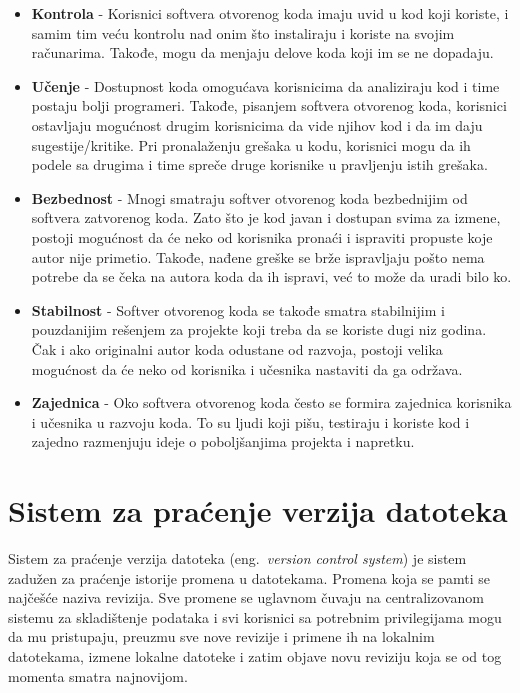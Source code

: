 \documentclass[12pt]{report}
\begin{document}
\begin{itemize}
    \item \textbf{Kontrola} - Korisnici softvera otvorenog koda imaju uvid u kod koji koriste, i samim tim veću kontrolu nad onim što instaliraju i koriste na svojim računarima. Takođe, mogu da menjaju delove koda koji im se ne dopadaju.
    \item \textbf{Učenje} - Dostupnost koda omogućava korisnicima da analiziraju kod i time postaju bolji programeri. Takođe, pisanjem softvera otvorenog koda, korisnici ostavljaju mogućnost drugim korisnicima da vide njihov kod i da im daju sugestije/kritike. Pri pronalaženju grešaka u kodu, korisnici mogu da ih podele sa drugima i time spreče druge korisnike u pravljenju istih grešaka.
    \item \textbf{Bezbednost} - Mnogi smatraju softver otvorenog koda bezbednijim od softvera zatvorenog koda. Zato što je kod javan i dostupan svima za izmene, postoji mogućnost da će neko od korisnika pronaći i ispraviti propuste koje autor nije primetio. Takođe, nađene greške se brže ispravljaju pošto nema potrebe da se čeka na autora koda da ih ispravi, već to može da uradi bilo ko.
    \item \textbf{Stabilnost} - Softver otvorenog koda se takođe smatra stabilnijim i pouzdanijim rešenjem za projekte koji treba da se koriste dugi niz godina. Čak i ako originalni autor koda odustane od razvoja, postoji velika mogućnost da će neko od korisnika i učesnika nastaviti da ga održava.
    \item \textbf{Zajednica} - Oko softvera otvorenog koda često se formira zajednica korisnika i učesnika u razvoju koda. To su ljudi koji pišu, testiraju i koriste kod i zajedno razmenjuju ideje o poboljšanjima projekta i napretku.
\end{itemize}

\section{Sistem za praćenje verzija datoteka}
Sistem za praćenje verzija datoteka (eng.\ \textit{version control system}) je sistem zadužen za praćenje istorije promena u datotekama. Promena koja se pamti se najčešće naziva revizija. Sve promene se uglavnom čuvaju na centralizovanom sistemu za skladištenje podataka i svi korisnici sa potrebnim privilegijama mogu da mu pristupaju, preuzmu sve nove revizije i primene ih na lokalnim datotekama, izmene lokalne datoteke i zatim objave novu reviziju koja se od tog momenta smatra najnovijom.
\end{document}
